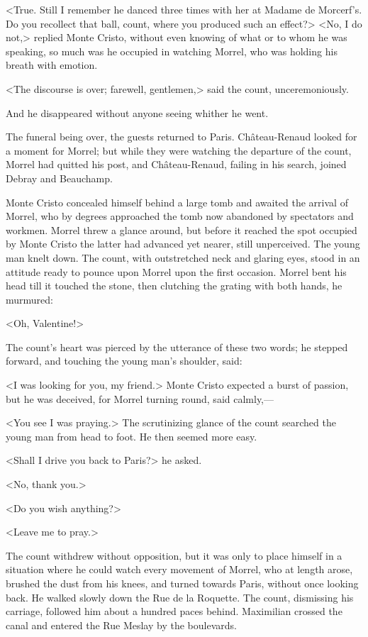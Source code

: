  <True. Still I remember he danced three times with her at Madame de Morcerf's. Do you recollect that ball, count, where you produced such an effect?>  <No, I do not,> replied Monte Cristo, without even knowing of what or to whom he was speaking, so much was he occupied in watching Morrel, who was holding his breath with emotion. 

 <The discourse is over; farewell, gentlemen,> said the count, unceremoniously. 

 And he disappeared without anyone seeing whither he went. 

 The funeral being over, the guests returned to Paris. Château-Renaud looked for a moment for Morrel; but while they were watching the departure of the count, Morrel had quitted his post, and Château-Renaud, failing in his search, joined Debray and Beauchamp. 

 Monte Cristo concealed himself behind a large tomb and awaited the arrival of Morrel, who by degrees approached the tomb now abandoned by spectators and workmen. Morrel threw a glance around, but before it reached the spot occupied by Monte Cristo the latter had advanced yet nearer, still unperceived. The young man knelt down. The count, with outstretched neck and glaring eyes, stood in an attitude ready to pounce upon Morrel upon the first occasion. Morrel bent his head till it touched the stone, then clutching the grating with both hands, he murmured: 

 <Oh, Valentine!> 

 The count's heart was pierced by the utterance of these two words; he stepped forward, and touching the young man's shoulder, said: 

 <I was looking for you, my friend.> Monte Cristo expected a burst of passion, but he was deceived, for Morrel turning round, said calmly,— 

 <You see I was praying.> The scrutinizing glance of the count searched the young man from head to foot. He then seemed more easy. 

 <Shall I drive you back to Paris?> he asked. 

 <No, thank you.> 

 <Do you wish anything?> 

 <Leave me to pray.> 

 The count withdrew without opposition, but it was only to place himself in a situation where he could watch every movement of Morrel, who at length arose, brushed the dust from his knees, and turned towards Paris, without once looking back. He walked slowly down the Rue de la Roquette. The count, dismissing his carriage, followed him about a hundred paces behind. Maximilian crossed the canal and entered the Rue Meslay by the boulevards. 

